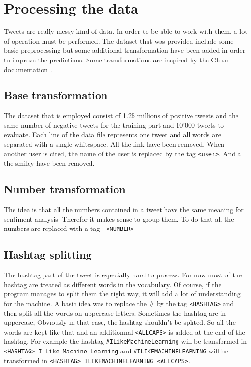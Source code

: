 \section{Processing the data}
Tweets are really messy kind of data. In order to be able to work with them, a lot of operation must be performed. The dataset that was provided include some basic preprocessing but some additional transformation have been added in order to improve the predictions. Some transformations are inspired by the Glove documentation \cite{Glove}. 

\subsection{Base transformation}
The dataset that is employed consist of 1.25 millions of positive tweets and the same number of negative tweets for the training part and 10'000 tweets to evaluate. Each line of the data file represents one tweet and all words are separated with a single whitespace. All the link have been removed. When another user is cited, the name of the user is replaced by the tag \texttt{<user>}. And all the smiley have been removed. 

\subsection{Number transformation}
The idea is that all the numbers contained in a tweet have the same meaning for sentiment analysis. Therefor it makes sense to group them. To do that all the numbers are replaced with a tag : \texttt{<NUMBER>}

\subsection{Hashtag splitting}
The hashtag part of the tweet is especially hard to process. For now most of the hashtag are treated as different words in the vocabulary. Of course, if the program manages to split them the right way, it will add a lot of understanding for the machine. A basic idea was to replace the \# by the tag \texttt{<HASHTAG>} and then split all the words on uppercase letters. Sometimes the hashtag are in uppercase, Obviously in that case, the hashtag shouldn't be splited. So all the words are kept like that and an additionnal \texttt{<ALLCAPS>} is added at the end of the hashtag. For example the hashtag \texttt{\#ILikeMachineLearning} will be transformed in \texttt{<HASHTAG> I Like Machine Learning} and \texttt{\#ILIKEMACHINELEARNING} will be transformed in \texttt{<HASHTAG> ILIKEMACHINELEARNING <ALLCAPS>}. 

